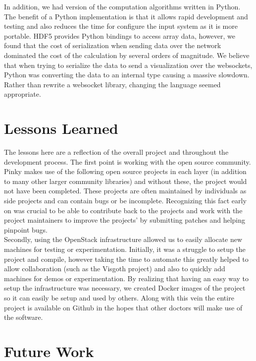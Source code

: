 In addition, we had version of the computation algorithms written in Python.
The benefit of a Python implementation is that it allows rapid development and
testing and also reduces the time for configure the input system as it is more
portable. HDF5 provides Python bindings to access array data, however, we found
that the cost of serialization when sending data over the network dominated the
cost of the calculation by several orders of magnitude.  We believe that when
trying to serialize the data to send a visualization over the websockets,
Python was converting the data to an internal type causing a massive slowdown.
Rather than rewrite a websocket library, changing the language seemed
appropriate.

\section{Lessons Learned}

The lessons here are a reflection of the overall project and throughout the
development process. The first point is working with the open source community.
Pinky makes use of the following open source projects \cite{edflib}
\cite{dropbox-json} \cite{websocket-server} \cite{tiledb} \cite{happyhttp} in
each layer (in addition to many other larger community libraries) and without
these, the project would not have been completed. These projects are often
maintained by individuals as side projects and can contain bugs or be
incomplete. Recognizing this fact early on was crucial to be able to contribute
back to the projects and work with the project maintainers to improve the
projects' by submitting patches and helping pinpoint bugs. \\

Secondly, using the OpenStack infrastructure allowed us to easily allocate new
machines for testing or experimentation. Initially, it was a struggle to setup
the project and compile, however taking the time to automate this greatly
helped to allow collaboration (such as the Visgoth project) and also to quickly
add machines for demos or experimentation. By realizing that having an easy way
to setup the infrastructure was necessary, we created Docker \cite{docker}
images of the project so it can easily be setup and used by others. Along with
this vein the entire project is available on Github \cite{eeg-toolkit} in the
hopes that other doctors will make use of the software.

\section{Future Work}\label{discuss-ch:future-work}

